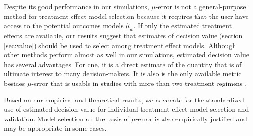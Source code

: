 Despite its good performance in our simulations, $\mu$-error is not a general-purpose method for treatment effect model selection because it requires that the user have access to the potential outcomes models $\hat\mu_w$. If only the estimated treatment effects are available, our results suggest that estimates of decision value (section \ref{sec:value}) should be used to select among treatment effect models. Although other methods perform almost as well in our simulations, estimated decision value has several advantages. For one, it is a direct estimate of the quantity that is of ultimate interest to many decision-makers. It is also is the only available metric besides $\mu$-error that is usable in studies with more than two treatment regimens \cite{Zhao:2017vi}. 

Based on our empirical and theoretical results, we advocate for the standardized use of estimated decision value for individual treatment effect model selection and validation. Model selection on the basis of $\mu$-error is also empirically justified and may be appropriate in some cases.


